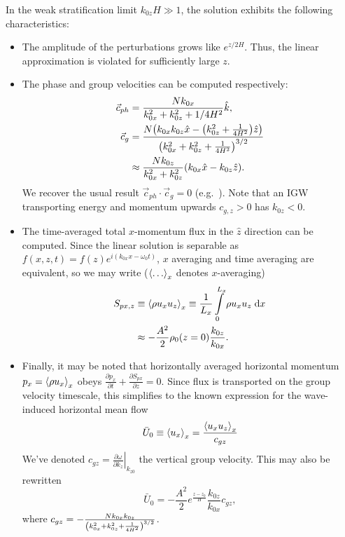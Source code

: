 \documentclass[twocolumn,
        nofootinbib, %
        usenames, %
        aps,
        prd,
        dvipsnames %
    ]{revtex4-1}%
\newcommand*{\pd}[2]{\frac{\partial#1}{\partial#2}}
\newcommand*{\at}[1]{\left.#1\right|}
\DeclarePairedDelimiter\ev{\langle}{\rangle}
\DeclarePairedDelimiter\p{\lparen}{\rparen}
\begin{document}
In the weak stratification limit $k_{0z}H \gg 1$, the solution exhibits the
following characteristics:
\begin{itemize}
    \item The amplitude of the perturbations grows like $e^{z/2H}$. Thus, the
        linear approximation is violated for sufficiently large $z$.

    \item The phase and group velocities can be computed respectively:
        \begin{align}
            \vec{c}_{ph} &= \frac{Nk_{0x}}{k_{0x}^2 + k_{0z}^2 + 1/4H^2} \hat{k},\\
            \vec{c}_{g} &= \frac{N\p*{k_{0x}k_{0z}\hat{x}
                - \p*{k_{0z}^2 + \frac{1}{4H^2}}\hat{z}}}
                {\p*{k_{0x}^2 + k_{0z}^2 + \frac{1}{4H^2}}^{3/2}} \nonumber\\
                &\approx \frac{Nk_{0z}}{k_{0x}^2 + k_{0z}^2}\p*{k_{0x}\hat{x} -
                k_{0z}\hat{z}}.
        \end{align}
        We recover the usual result $\vec{c}_{ph} \cdot \vec{c}_g = 0$
        (e.g.\ \cite{drazin,sutherland1}). Note that an IGW transporting energy
        and momentum upwards $c_{g, z} > 0$ has $k_{0z} < 0$.

    \item The time-averaged total $x$-momentum flux in the $\hat{z}$ direction
        can be computed. Since the linear solution is separable as $f(x, z, t) =
        f(z)e^{i(k_{0x}x - \omega_0 t)}$, $x$ averaging and time averaging are
        equivalent, so we may write ($\ev*{\dots}_x$ denotes $x$-averaging)
        \begin{align}
            S_{px, z} &\equiv \ev*{\rho u_x u_z}_x \equiv
                \frac{1}{L_x}\int_0^{L_x}\limits \rho u_x u_z\;\mathrm{d}x
                    \nonumber\\
                &\approx -\frac{A^2}{2}\rho_0(z=0)\frac{k_{0z}}{k_{0x}}.
                    \label{eq:fpx_lin}
        \end{align}

    \item Finally, it may be noted that horizontally averaged horizontal
        momentum $p_x = \ev*{\rho u_x}_x$ obeys $\pd{p_x}{t} + \pd{S_{px}}{z} =
        0$. Since flux is transported on the group velocity
        timescale\cite{sutherland0}, this simplifies to the known expression for
        the wave-induced horizontal mean flow\cite{sutherland0,sutherland1}
        \begin{equation}
            \bar{U}_0 \equiv \ev*{u_x}_x = \frac{\ev*{u_xu_z}_x}{c_{gz}}
        \end{equation}
        We've denoted $c_{gz} = \at{\pd{\omega}{k_{z}}}_{k_{z0}}$ the vertical group
        velocity. This may also be rewritten
        \begin{equation}
            \bar{U}_0 = -\frac{A^2}{2}e^{\frac{z - z_0}{H}}
                \frac{k_{0z}}{k_{0x}}c_{gz}, \label{eq:u0_lin}
        \end{equation}
        where $c_{gz} = -\frac{Nk_{0x}k_{0z}}{\p*{k_{0x}^2 + k_{0z}^2 +
        \frac{1}{4H^2}}^{3/2}}$.
\end{itemize}
\end{document}
